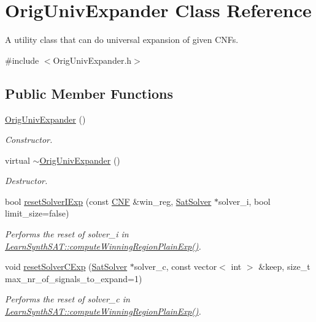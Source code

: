 \hypertarget{classOrigUnivExpander}{\section{Orig\-Univ\-Expander Class Reference}
\label{classOrigUnivExpander}
}


A utility class that can do universal expansion of given C\-N\-Fs.  




{\ttfamily \#include $<$Orig\-Univ\-Expander.\-h$>$}

\subsection*{Public Member Functions}
\begin{DoxyCompactItemize}
\item 
\hyperlink{classOrigUnivExpander_a61521e0c80376b67f7859531f86b69cb}{Orig\-Univ\-Expander} ()
\begin{DoxyCompactList}\small\item\em Constructor. \end{DoxyCompactList}\item 
virtual \hyperlink{classOrigUnivExpander_a0cd23ac105ad8c0674df2a97943d12af}{$\sim$\-Orig\-Univ\-Expander} ()
\begin{DoxyCompactList}\small\item\em Destructor. \end{DoxyCompactList}\item 
bool \hyperlink{classOrigUnivExpander_abcd12e41626b01f53ac7b8c654fa9218}{reset\-Solver\-I\-Exp} (const \hyperlink{classCNF}{C\-N\-F} \&win\-\_\-reg, \hyperlink{classSatSolver}{Sat\-Solver} $\ast$solver\-\_\-i, bool limit\-\_\-size=false)
\begin{DoxyCompactList}\small\item\em Performs the reset of solver\-\_\-i in \hyperlink{classLearnSynthSAT_a8727927b4e0432acb6bcea883fd2f1f9}{Learn\-Synth\-S\-A\-T\-::compute\-Winning\-Region\-Plain\-Exp()}. \end{DoxyCompactList}\item 
void \hyperlink{classOrigUnivExpander_a0752883a0f7a9bb17d5eda38a7dda2a1}{reset\-Solver\-C\-Exp} (\hyperlink{classSatSolver}{Sat\-Solver} $\ast$solver\-\_\-c, const vector$<$ int $>$ \&keep, size\-\_\-t max\-\_\-nr\-\_\-of\-\_\-signals\-\_\-to\-\_\-expand=1)
\begin{DoxyCompactList}\small\item\em Performs the reset of solver\-\_\-c in \hyperlink{classLearnSynthSAT_a8727927b4e0432acb6bcea883fd2f1f9}{Learn\-Synth\-S\-A\-T\-::compute\-Winning\-Region\-Plain\-Exp()}. \end{DoxyCompactList}\item 

\end{DoxyCompactItemize}
